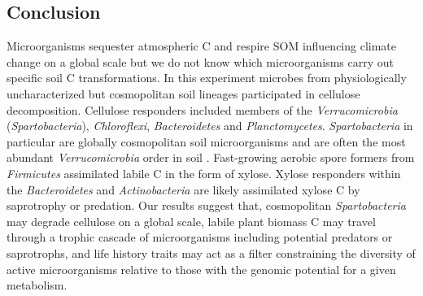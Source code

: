 \subsection{Conclusion} 
Microorganisms sequester atmospheric C and respire SOM influencing climate
change on a global scale but we do not know which microorganisms carry out
specific soil C transformations. In this experiment microbes from
physiologically uncharacterized but cosmopolitan soil lineages participated in
cellulose decomposition. Cellulose responders included members of the
\textit{Verrucomicrobia} (\textit{Spartobacteria}), \textit{Chloroflexi},
\textit{Bacteroidetes} and \textit{Planctomycetes}. \textit{Spartobacteria} in
particular are globally cosmopolitan soil microorganisms and are often the most
abundant \textit{Verrucomicrobia} order in soil \citep{Bergmann_2011}.
Fast-growing aerobic spore formers from \textit{Firmicutes} assimilated labile
C in the form of xylose. Xylose responders within the \textit{Bacteroidetes}
and \textit{Actinobacteria} are likely assimilated xylose C  by saprotrophy or
predation. Our results suggest that, cosmopolitan \textit{Spartobacteria} may
degrade cellulose on a global scale, labile plant biomass C may travel through
a trophic cascade of microorganisms including potential predators or
saprotrophs, and life history traits may act as a filter constraining the
diversity of active microorganisms relative to those with the genomic potential
for a given metabolism.
